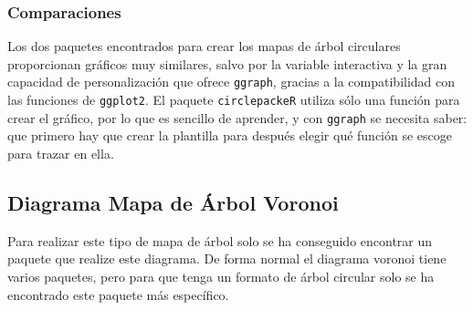 \documentclass{article}\usepackage[]{graphicx}\usepackage[]{color}
\begin{document}
\subsubsection{Comparaciones}
Los dos paquetes encontrados para crear los mapas de \'arbol circulares proporcionan gr\'aficos muy similares, salvo por la variable interactiva y la gran capacidad de personalizaci\'on que ofrece \texttt{ggraph}, gracias a la compatibilidad con las funciones de \texttt{ggplot2}.
El paquete \texttt{circlepackeR} utiliza s\'olo una funci\'on para crear el gr\'afico, por lo que es sencillo de aprender, y con \texttt{ggraph} se necesita saber: que primero hay que crear la plantilla para despu\'es elegir qu\'e funci\'on se escoge para trazar en ella.
\clearpage
\subsection{Diagrama Mapa de \'Arbol Voronoi}\label{ssec:arbolpoligonos}
Para realizar este tipo de mapa de \'arbol solo se ha conseguido encontrar un paquete que realize este diagrama. De forma normal el diagrama voronoi tiene varios paquetes, pero para que tenga un formato de \'arbol circular solo se ha encontrado este paquete m\'as espec\'ifico.
\end{document}
